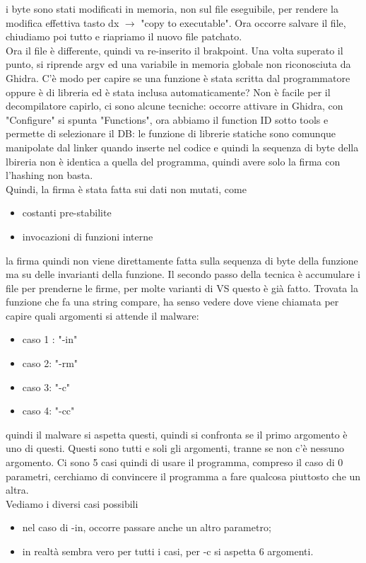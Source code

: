 \documentclass[12pt, oneside]{extbook}
\begin{document}
i byte sono stati modificati in memoria, non sul file eseguibile, per rendere la modifica effettiva tasto dx $\rightarrow$ "copy to executable". Ora occorre salvare il file, chiudiamo poi tutto e riapriamo il nuovo file patchato.\\Ora il file è differente, quindi va re-inserito il brakpoint. Una volta superato il punto, si riprende argv ed una variabile in memoria globale non riconosciuta da Ghidra. C'è modo per capire se una funzione è stata scritta dal programmatore oppure è di libreria ed è stata inclusa automaticamente? Non è facile per il decompilatore capirlo, ci sono alcune tecniche: occorre attivare in Ghidra, con "Configure" si spunta "Functions", ora abbiamo il function ID sotto tools e permette di selezionare il DB: le funzione di librerie statiche sono comunque manipolate dal linker quando inserte nel codice e quindi la sequenza di byte della lbireria non è identica a quella del programma, quindi avere solo la firma con l'hashing non basta.\\Quindi, la firma è stata fatta sui dati non mutati, come
\begin{itemize}
\item costanti pre-stabilite
\item invocazioni di funzioni interne
\end{itemize}
la firma quindi non viene direttamente fatta sulla sequenza di byte della funzione ma su delle invarianti della funzione. Il secondo passo della tecnica è accumulare i file per prenderne le firme, per molte varianti di VS questo è già fatto. Trovata la funzione che fa una string compare, ha senso vedere dove viene chiamata per capire quali argomenti si attende il malware:
\begin{itemize}
\item caso 1 : "-in"
\item caso 2: "-rm"
\item caso 3: "-c"
\item caso 4: "-cc"
\end{itemize}
quindi il malware si aspetta questi, quindi si confronta se il primo argomento è uno di questi. Questi sono tutti e soli gli argomenti, tranne se non c'è  nessuno argomento. Ci sono 5 casi quindi di usare il programma, compreso il caso di 0 parametri, cerchiamo di convincere il programma a fare qualcosa piuttosto che un altra.\\Vediamo i diversi casi possibili
\begin{itemize}
\item nel caso di -in, occorre passare anche un altro parametro;
\item in realtà sembra vero per tutti i casi, per -c si aspetta 6 argomenti.
\end{itemize}
\end{document}
